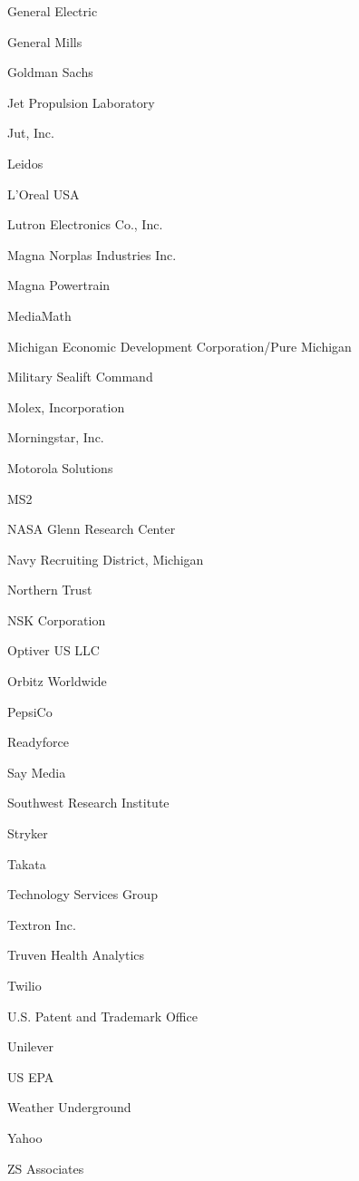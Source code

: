 \documentclass[twoside]{article}
\begin{document}
\begin{center}
\begin{multicols}{5}
\begin{FlushLeft}
\begin{compactitem}
\item General Electric
\item General Mills
\item Goldman Sachs
\item Jet Propulsion Laboratory
\item Jut, Inc.
\item Leidos
\item L'Oreal USA
\item Lutron Electronics Co., Inc.
\item Magna Norplas Industries Inc.
\item Magna Powertrain
\item MediaMath
\item Michigan Economic Development Corporation/Pure Michigan
\item Military Sealift Command
\item Molex, Incorporation
\item Morningstar, Inc.
\item Motorola Solutions
\item MS2
\item NASA Glenn Research Center
\item Navy Recruiting District, Michigan
\item Northern Trust
\item NSK Corporation
\item Optiver US LLC
\item Orbitz Worldwide
\item PepsiCo
\item Readyforce
\item Say Media
\item Southwest Research Institute
\item Stryker
\item Takata
\item Technology Services Group
\item Textron Inc.
\item Truven Health Analytics
\item Twilio
\item U.S. Patent and Trademark Office
\item Unilever
\item US EPA
\item Weather Underground
\item Yahoo
\item ZS Associates
\end{compactitem}
        \end{FlushLeft}

\end{multicols}
\end{center}
\end{document}
